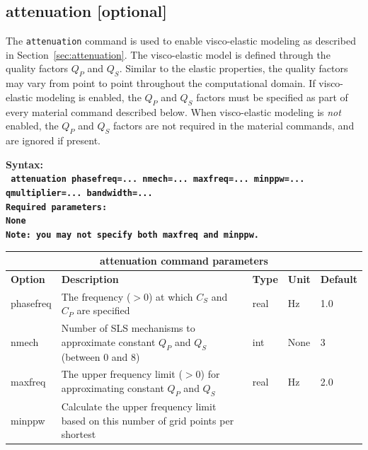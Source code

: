 \documentclass[11pt]{report}
\begin{document}
{\subsection{attenuation [optional]}
\label{keyword:attenuation}

The \verb+attenuation+ command is used to enable visco-elastic modeling as described in
Section~\ref{sec:attenuation}. The visco-elastic model is defined through the quality factors $Q_P$
and $Q_S$. Similar to the elastic properties, the quality factors may vary from point to point
throughout the computational domain. If visco-elastic modeling is enabled, the $Q_P$ and $Q_S$
factors must be specified as part of every material command described below. When visco-elastic
modeling is {\em not} enabled, the $Q_P$ and $Q_S$ factors are not required in the material
commands, and are ignored if present.
\begin{flushleft}\bf
	Syntax:\\
	\tt
	attenuation phasefreq=... nmech=... maxfreq=... minppw=... qmultiplier=... bandwidth=...
	\\
	\bf Required parameters:\\
	\rm None \\
	\bf Note: \rm you may not specify both \verb+maxfreq+ and \verb+minppw+.
\end{flushleft}
%
\begin{center}
	\begin{tabular}{|l|p{8cm}|l|l|l|} \hline
		\multicolumn{5}{|c|}{\bf attenuation command parameters}                                                                                         \\ \hline
		\bf{Option}        & \bf{Description}                                                                     & \bf{Type} & \bf{Unit} & \bf{Default} \\ \hline \hline
		phasefreq          & The frequency ($>0$) at which $C_S$ and $C_P$ are specified                          & real      & Hz        & 1.0          \\ \hline
		nmech              & Number of SLS mechanisms to approximate constant $Q_P$ and $Q_S$ (between 0 and 8)   & int       & None      & 3            \\ \hline
		maxfreq            & The upper frequency limit  ($>0$) for approximating constant $Q_P$ and $Q_S$         & real      & Hz        & 2.0          \\ \hline
		minppw             & Calculate the upper frequency limit based on this number of grid points per shortest

\end{tabular}
\end{center}}
\end{document}
